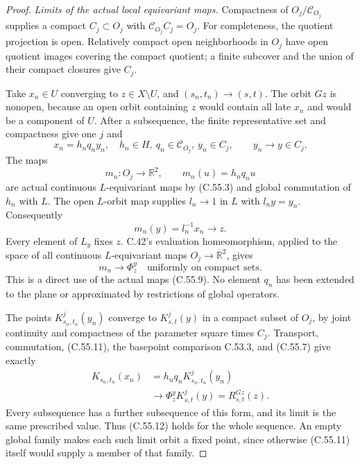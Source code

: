 \begin{proof}
\emph{Limits of the actual local equivariant maps.}
Compactness of $O_j/\mathcal C_{O_j}$ supplies a compact
$C_j\subset O_j$ with $\mathcal C_{O_j}C_j=O_j$.
For completeness, the quotient projection is open.
Relatively compact open neighborhoods in $O_j$ have
open quotient images covering the compact quotient;
a finite subcover and the union of their compact
closures give $C_j$.

Take $x_n\in U$ converging to $z\in X\setminus U$,
and $(s_n,t_n)\to(s,t)$. The orbit $Gz$ is nonopen,
because an open orbit containing $z$ would contain
all late $x_n$ and would be a component of $U$.
After a subsequence, the finite representative set
and compactness give one $j$ and
\[
 x_n=h_nq_ny_n,
 \quad h_n\in H,\ q_n\in\mathcal C_{O_j},\ y_n\in C_j,
 \qquad y_n\longrightarrow y\in C_j.
                                                        \tag{C.55.8}
\]
The maps
\[
 m_n:O_j\longrightarrow\mathbb R^2,
                  \qquad m_n(u)=h_nq_nu
                                                        \tag{C.55.9}
\]
are actual continuous $L$-equivariant maps by
(C.55.3) and global commutation of $h_n$ with $L$.
The open $L$-orbit map supplies $l_n\to1$ in $L$
with $l_ny=y_n$. Consequently
\[
                    m_n(y)=l_n^{-1}x_n\longrightarrow z.
                                                        \tag{C.55.10}
\]
Every element of $L_y$ fixes $z$. C.42's evaluation
homeomorphism, applied to the space of all continuous
$L$-equivariant maps $O_j\to\mathbb R^2$, gives
\[
                  m_n\longrightarrow\Phi_z^y
                         \quad\text{uniformly on compact sets}.
                                                        \tag{C.55.11}
\]
This is a direct use of the actual maps (C.55.9).
No element $q_n$ has been extended to the plane or
approximated by restrictions of global operators.

The points $K^j_{s_n,t_n}(y_n)$ converge to
$K^j_{s,t}(y)$ in a compact subset of $O_j$, by joint
continuity and compactness of the parameter square
times $C_j$. Transport, commutation, (C.55.11), the
basepoint comparison C.53.3, and (C.55.7) give exactly
\[
 \begin{split}
 K_{s_n,t_n}(x_n)
   &=h_nq_nK^j_{s_n,t_n}(y_n)\\
   &\longrightarrow\Phi_z^y K^j_{s,t}(y)
                      =R^{Gz}_{s,t}(z).
 \end{split}                                            \tag{C.55.12}
\]
Every subsequence has a further subsequence of this
form, and its limit is the same prescribed value.
Thus (C.55.12) holds for the whole sequence.
An empty global family makes each such limit orbit
a fixed point, since otherwise (C.55.11) itself
would supply a member of that family.


\end{proof}
